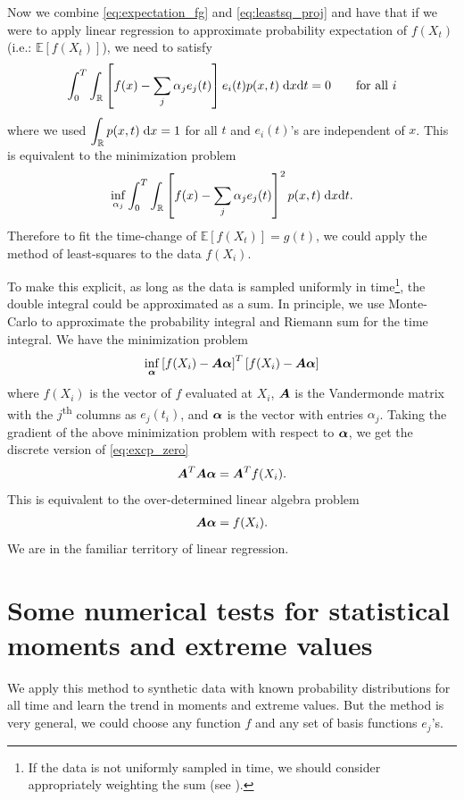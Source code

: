 \documentclass[11pt,letterpaper]{article}
\begin{document}
Now we combine \eqref{eq:expectation_fg} and \eqref{eq:leastsq_proj} and have that if we were to apply linear regression to approximate probability expectation of $f(X_t)$ (i.e.: $\mathbb{E}[f(X_t)]$), we need to satisfy 
\begin{align}
    \int_0^T\int_\mathbb{R} \left[f(x)-\sum_j\alpha_je_j(t)\right]e_i(t)p(x,t)\;\mathrm{d} x\mathrm{d} t = 0\quad \mbox{} \quad \text{for all $i$}\label{eq:excp_zero}
\end{align}
where we used $\displaystyle{\int_\mathbb{R} p(x,t)\;\mathrm{d}x = 1}$ for all $t$ and $e_i(t)$'s are independent of $x$. This is equivalent to the minimization problem
\begin{align}
    \inf_{\alpha_j}\int_0^T \int_\mathbb{R} \left[f(x)-\sum_j\alpha_je_j(t)\right]^2p(x,t)\;\mathrm{d} x\mathrm{d} t.
\end{align}
Therefore to fit the time-change of $\mathbb{E}[f(X_t)] = g(t)$, we could apply the method of least-squares to the data $f(X_i)$. 

To make this explicit, as long as the data is sampled uniformly in time\footnote{If the data is not uniformly sampled in time, we should consider appropriately weighting the sum (see \cite{Du_23}).}, the double integral could be approximated as a sum. In principle, we use Monte-Carlo to approximate the probability integral and Riemann sum for the time integral. We have the minimization problem
\begin{align}
    \inf_{\boldsymbol{\alpha}} \left[f(X_i)-\boldsymbol{A}\boldsymbol{\alpha}\right]^T\left[f(X_i)-\boldsymbol{A}\boldsymbol{\alpha}\right]
\end{align}
where $f(X_i)$ is the vector of $f$ evaluated at $X_i$, $\boldsymbol{A}$ is the Vandermonde matrix with the $j$\textsuperscript{th} columns as $e_j(t_i)$, and $\boldsymbol{\alpha}$ is the vector with entries $\alpha_j$. Taking the gradient of the above minimization problem with respect to $\boldsymbol{\alpha}$, we get the discrete version of \eqref{eq:excp_zero}
\begin{align}
    \boldsymbol{A}^T\boldsymbol{A}\boldsymbol{\alpha} = \boldsymbol{A}^T f(X_i).
\end{align}
This is equivalent to the over-determined linear algebra problem
\begin{align}
    \boldsymbol{A}\boldsymbol{\alpha} = f(X_i).
\end{align}
We are in the familiar territory of linear regression.

\section{Some numerical tests for statistical moments and extreme values}\label{sec:numerical}
We apply this method to synthetic data with known probability distributions for all time and learn the trend in moments and extreme values. But the method is very general, we could choose any function $f$ and any set of basis functions $e_j$'s. 
\end{document}
